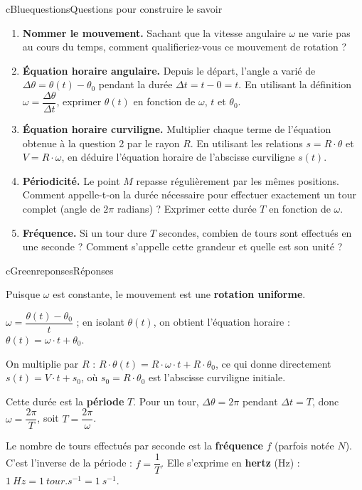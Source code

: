\documentclass[11pt,a4paper]{article}
\newcommand{\kw}[1]{{\sffamily\bfseries\color{cBlue}#1}}   %
\begin{document}
\begin{rub}{cBlue}{questions}{Questions pour construire le savoir}
\begin{enumerate}
  \item \kw{Nommer le mouvement.} Sachant que la vitesse angulaire $\omega$ ne varie pas au cours du temps, comment qualifieriez-vous ce mouvement de rotation ?
  \item \kw{Équation horaire angulaire.} Depuis le départ, l’angle a varié de $\Delta\theta = \theta(t) - \theta_0$ pendant la durée $\Delta t = t - 0 = t$. En utilisant la définition $\omega = \dfrac{\Delta\theta}{\Delta t}$, exprimer $\theta(t)$ en fonction de $\omega$, $t$ et $\theta_0$.
  \item \kw{Équation horaire curviligne.} Multiplier chaque terme de l’équation obtenue à la question 2 par le rayon $R$. En utilisant les relations $s = R\cdot\theta$ et $V = R\cdot\omega$, en déduire l’équation horaire de l’abscisse curviligne $s(t)$.
  \item \kw{Périodicité.} Le point $M$ repasse régulièrement par les mêmes positions. Comment appelle-t-on la durée nécessaire pour effectuer exactement un tour complet (angle de $2\pi$ radians) ? Exprimer cette durée $T$ en fonction de $\omega$.
  \item \kw{Fréquence.} Si un tour dure $T$ secondes, combien de tours sont effectués en une seconde ? Comment s’appelle cette grandeur et quelle est son unité ?
\end{enumerate}
\end{rub}

\begin{rub}{cGreen}{reponses}{Réponses}
\begin{reps}
  \item Puisque $\omega$ est constante, le mouvement est une \textbf{rotation uniforme}.
  \item $\omega = \dfrac{\theta(t) - \theta_0}{t}$ ; en isolant $\theta(t)$, on obtient l’équation horaire : $\theta(t) = \omega\cdot t + \theta_0$.
  \item On multiplie par $R$ : $R\cdot\theta(t) = R\cdot\omega\cdot t + R\cdot\theta_0$, ce qui donne directement $s(t) = V\cdot t + s_0$, où $s_0 = R\cdot\theta_0$ est l’abscisse curviligne initiale.
  \item Cette durée est la \textbf{période} $T$. Pour un tour, $\Delta\theta = 2\pi$ pendant $\Delta t = T$, donc $\omega = \dfrac{2\pi}{T}$, soit $T = \dfrac{2\pi}{\omega}$.
  \item Le nombre de tours effectués par seconde est la \textbf{fréquence} $f$ (parfois notée $N$). C’est l’inverse de la période : $f = \dfrac{1}{T}$. Elle s’exprime en \textbf{hertz} (Hz) : $\qty{1}{Hz} = \qty{1}{tour.s^{-1}} = \qty{1}{s^{-1}}$.
\end{reps}
\end{rub}
\end{document}
